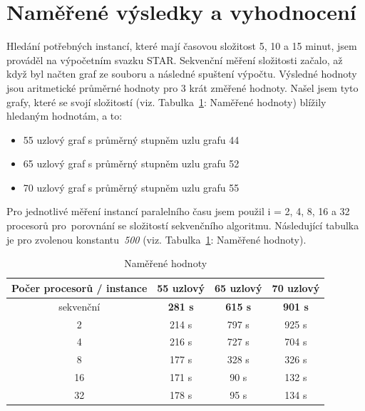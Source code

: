\documentclass[11pt]{article}
\begin{document}
\section{Naměřené výsledky a vyhodnocení}

Hledání potřebných instancí, které mají časovou složitost 5, 10 a 15 minut, jsem prováděl na výpočetním svazku STAR. Sekvenční měření složitosti začalo, až když byl načten graf ze souboru a následné spuštení výpočtu. Výsledné hodnoty jsou aritmetické průměrné hodnoty pro 3 krát změřené hodnoty. Našel jsem tyto grafy, které se svojí složitostí (viz. Tabulka~\ref{tab:namereneHodnoty}: Naměřené hodnoty) blížily hledaným hodnotám, a to:

\begin{itemize}
	\item 55 uzlový graf s  průměrný stupněm uzlu grafu 44
	\item 65 uzlový graf s  průměrný stupněm uzlu grafu 52 
	\item 70 uzlový graf s  průměrný stupněm uzlu grafu 55
\end{itemize}

Pro jednotlivé měření instancí paralelního času jsem použil i = 2, 4, 8, 16 a 32 procesorů pro~porovnání se složitostí sekvenčního algoritmu. Následující tabulka je pro zvolenou konstantu~\textit{500} (viz. Tabulka~\ref{tab:namereneHodnoty}: Naměřené hodnoty).

\begin{table}[h]
	\caption{Naměřené hodnoty}
	\label{tab:namereneHodnoty}
	\centering
	\begin{tabular}{| c || c | c | c |}
		\hline
		\textbf{Počer procesorů / instance} & \textbf{55 uzlový} & \textbf{65 uzlový} & \textbf{70 uzlový} \\
		\hline \hline
		sekvenční & \textbf{281 s} & \textbf{615 s} & \textbf{901 s}  \\
		\hline
		2 & 214 s & 797 s & 925 s \\
		\hline
		4 & 216 s & 727 s & 704 s  \\
		\hline
		8 & 177 s & 328 s & 326 s \\
		\hline
		16 & 171 s & 90 s & 132 s  \\
		\hline
		32 & 178 s & 95 s & 134 s  \\
		\hline
	\end{tabular}
\end{table}
\end{document}
